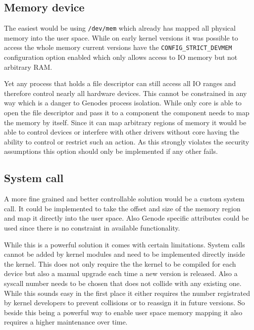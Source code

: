 \documentclass[
a4paper,
12pt,
notitlepage,
parskip=half,
DIV=11,
]{scrbook}
\begin{document}
		
		\subsection{Memory device}
		
		The easiest would be using \texttt{/dev/mem} which already has mapped all physical memory into the user space.
		While on early kernel versions it was possible to access the whole memory current versions have the \texttt{CONFIG\_STRICT\_DEVMEM} configuration option enabled which only allows access to IO memory but not arbitrary RAM.
		
		Yet any process that holds a file descriptor can still access all IO ranges and therefore control nearly all hardware devices.
		This cannot be constrained in any way which is a danger to Genodes process isolation.
		While only core is able to open the file descriptor and pass it to a component the component needs to map the memory by itself.
		Since it can map arbitrary regions of memory it would be able to control devices or interfere with other drivers without core having the ability to control or restrict such an action.
		As this strongly violates the security assumptions this option should only be implemented if any other fails. \citep{devmem} 
		
		\subsection{System call}
		
		A more fine grained and better controllable solution would be a custom system call.
		It could be implemented to take the offset and size of the memory region and map it directly into the user space.
		Also Genode specific attributes could be used since there is no constraint in available functionality.
		
		While this is a powerful solution it comes with certain limitations.
		System calls cannot be added by kernel modules and need to be implemented directly inside the kernel.
		This does not only require the the kernel to be compiled for each device but also a manual upgrade each time a new version is released.
		Also a syscall number needs to be chosen that does not collide with any existing one.
		While this sounds easy in the first place it either requires the number registrated by kernel developers to prevent collisions or to reassign it in future versions.
		So beside this being a powerful way to enable user space memory mapping it also requires a higher maintenance over time. \citep{syscall}
		
\end{document}

